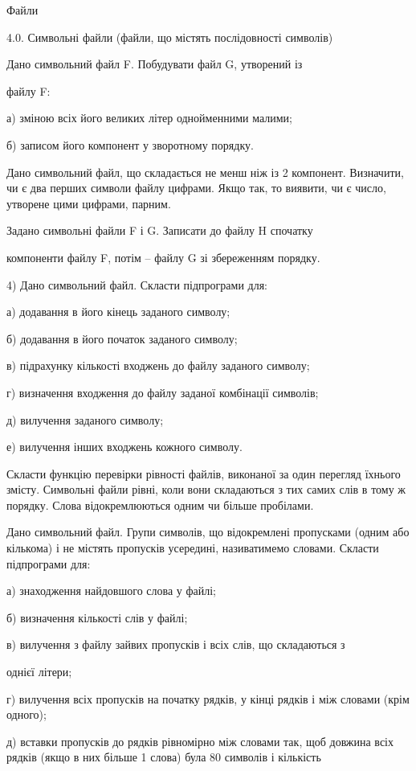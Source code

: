 \documentclass[]{article}
\begin{document}
\protect\hypertarget{_Hlk48904419}{}{}Файли

4.0. Символьні файли (файли, що містять послідовності символів)

Дано символьний файл F. Побудувати файл G, утворений із

файлу F:

а) зміною всіх його великих літер однойменними малими;

б) записом його компонент у зворотному порядку.

Дано символьний файл, що складається не менш ніж із 2 компонент.
Визначити, чи є два перших символи файлу цифрами. Якщо так, то виявити,
чи є число, утворене цими цифрами, парним.

Задано символьні файли F і G. Записати до файлу H спочатку

компоненти файлу F, потім -- файлу G зі збереженням порядку.

4) Дано символьний файл. Скласти підпрограми для:

а) додавання в його кінець заданого символу;

б) додавання в його початок заданого символу;

в) підрахунку кількості входжень до файлу заданого символу;

г) визначення входження до файлу заданої комбінації символів;

д) вилучення заданого символу;

е) вилучення інших входжень кожного символу.

Скласти функцію перевірки рівності файлів, виконаної за один перегляд
їхнього змісту. Символьні файли рівні, коли вони складаються з тих самих
слів в тому ж порядку. Слова відокремлюються одним чи більше пробілами.

Дано символьний файл. Групи символів, що відокремлені пропусками (одним
або кількома) і не містять пропусків усередині, називатимемо словами.
Скласти підпрограми для:

а) знаходження найдовшого слова у файлі;

б) визначення кількості слів у файлі;

в) вилучення з файлу зайвих пропусків і всіх слів, що складаються з

однієї літери;

г) вилучення всіх пропусків на початку рядків, у кінці рядків і між
словами (крім одного);

д) вставки пропусків до рядків рівномірно між словами так, щоб довжина
всіх рядків (якщо в них більше 1 слова) була 80 символів і кількість
\end{document}
